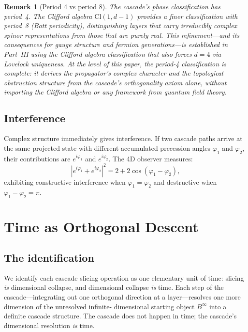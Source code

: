 \documentclass[12pt,a4paper]{article}
\newtheorem{remark}[theorem]{Remark}
\begin{document}
\begin{remark}[Period 4 vs period 8]\label{rem:period4-vs-8}
The cascade's phase classification has period~4. The Clifford algebra
$\mathrm{Cl}(1,d-1)$ provides a finer classification with period~8 (Bott periodicity),
distinguishing layers that carry irreducibly complex spinor representations from those
that are purely real. This refinement---and its consequences for gauge structure and
fermion generations---is established in Part~III using the Clifford algebra classification
that also forces $d = 4$ via Lovelock uniqueness. At the level of this paper, the period-4
classification is complete: it derives the propagator's complex character and the
topological obstruction structure from the cascade's orthogonality axiom alone, without
importing the Clifford algebra or any framework from quantum field theory.
\end{remark}

\subsection{Interference}

Complex structure immediately gives interference. If two cascade paths arrive at the same
projected state with different accumulated precession angles $\varphi_1$ and $\varphi_2$,
their contributions are $e^{i\varphi_1}$ and $e^{i\varphi_2}$. The 4D observer measures:
\[
|e^{i\varphi_1}+e^{i\varphi_2}|^2 = 2+2\cos(\varphi_1-\varphi_2),
\]
exhibiting constructive interference when $\varphi_1=\varphi_2$ and destructive when
$\varphi_1-\varphi_2=\pi$.

\section{Time as Orthogonal Descent}

\subsection{The identification}\label{subsec:time-id}

We identify each cascade slicing operation as one elementary unit of time:
slicing \emph{is} dimensional collapse, and dimensional collapse \emph{is}
time. Each step of the cascade---integrating out one orthogonal direction
at a layer---resolves one more dimension of the unresolved infinite-
dimensional starting object $B^\infty$ into a definite cascade structure.
The cascade does not happen in time; the cascade's dimensional resolution
\emph{is} time.
\end{document}
